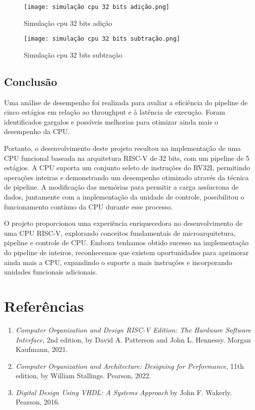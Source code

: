 \documentclass[12pt]{article}
\begin{document}
\begin{figure}[h]
    \centering
    \texttt{[image: simulação cpu 32 bits adição.png]}
    \caption{Simulação cpu 32 bits adição}
\end{figure}

\begin{figure}[h]
    \centering
    \texttt{[image: simulação cpu 32 bits subtração.png]}
    \caption{Simulação cpu 32 bits subtração}
\end{figure}

\newpage
\newpage

\subsection{Conclusão}
Uma análise de desempenho foi realizada para avaliar a eficiência do pipeline de cinco estágios em relação ao throughput e à latência de execução. Foram identificados gargalos e possíveis melhorias para otimizar ainda mais o desempenho da CPU.

Portanto, o desenvolvimento deste projeto resultou na implementação de uma CPU funcional baseada na arquitetura RISC-V de 32 bits, com um pipeline de 5 estágios. A CPU suporta um conjunto seleto de instruções do RV32I, permitindo operações inteiras e demonstrando um desempenho otimizado através da técnica de pipeline. A modificação das memórias para permitir a carga assíncrona de dados, juntamente com a implementação da unidade de controle, possibilitou o funcionamento contínuo da CPU durante esse processo.

O projeto proporcionou uma experiência enriquecedora no desenvolvimento de uma CPU RISC-V, explorando conceitos fundamentais de microarquitetura, pipeline e controle de CPU. Embora tenhamos obtido sucesso na implementação do pipeline de inteiros, reconhecemos que existem oportunidades para aprimorar ainda mais a CPU, expandindo o suporte a mais instruções e incorporando unidades funcionais adicionais.

\section{Referências}

\begin{enumerate}
\item \textit{Computer Organization and Design RISC-V Edition: The Hardware Software Interface}, 2nd edition, by David A. Patterson and John L. Hennessy. Morgan Kaufmann, 2021.

\item \textit{Computer Organization and Architecture: Designing for Performance}, 11th edition, by William Stallings. Pearson, 2022.

\item \textit{Digital Design Using VHDL: A Systems Approach} by John F. Wakerly. Pearson, 2016.

\end{enumerate}
\end{document}
